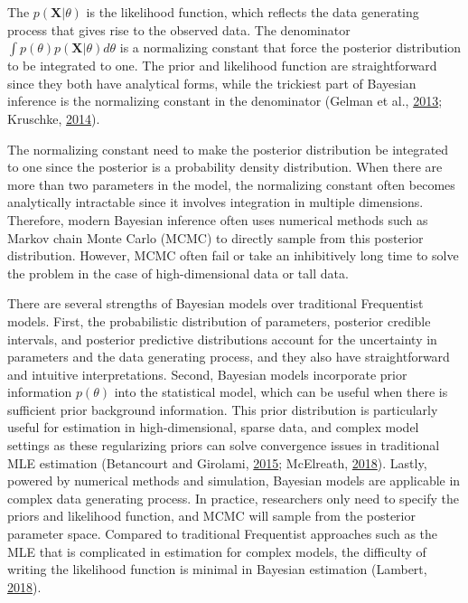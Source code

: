 \documentclass[12pt]{book}
\numberwithin{equation}{chapter}
\begin{document}
The \(p(\mathbf{X}|\theta)\) is the likelihood function, which reflects the data generating process that gives rise to the observed data. The denominator \(\int p(\theta)p(\mathbf{X}|\theta)d\theta\) is a normalizing constant that force the posterior distribution to be integrated to one. The prior and likelihood function are straightforward since they both have analytical forms, while the trickiest part of Bayesian inference is the normalizing constant in the denominator (Gelman et al., \protect\hyperlink{ref-gelman2013bayesian}{2013}; Kruschke, \protect\hyperlink{ref-kruschke2014doing}{2014}).

The normalizing constant need to make the posterior distribution be integrated to one since the posterior is a probability density distribution. When there are more than two parameters in the model, the normalizing constant often becomes analytically intractable since it involves integration in multiple dimensions. Therefore, modern Bayesian inference often uses numerical methods such as Markov chain Monte Carlo (MCMC) to directly sample from this posterior distribution. However, MCMC often fail or take an inhibitively long time to solve the problem in the case of high-dimensional data or tall data.

There are several strengths of Bayesian models over traditional Frequentist models. First, the probabilistic distribution of parameters, posterior credible intervals, and posterior predictive distributions account for the uncertainty in parameters and the data generating process, and they also have straightforward and intuitive interpretations. Second, Bayesian models incorporate prior information \(p(\theta)\) into the statistical model, which can be useful when there is sufficient prior background information. This prior distribution is particularly useful for estimation in high-dimensional, sparse data, and complex model settings as these regularizing priors can solve convergence issues in traditional MLE estimation (Betancourt and Girolami, \protect\hyperlink{ref-betancourt2015hamiltonian}{2015}; McElreath, \protect\hyperlink{ref-mcelreath2018statistical}{2018}). Lastly, powered by numerical methods and simulation, Bayesian models are applicable in complex data generating process. In practice, researchers only need to specify the priors and likelihood function, and MCMC will sample from the posterior parameter space. Compared to traditional Frequentist approaches such as the MLE that is complicated in estimation for complex models, the difficulty of writing the likelihood function is minimal in Bayesian estimation (Lambert, \protect\hyperlink{ref-lambert2018student}{2018}).
\end{document}
